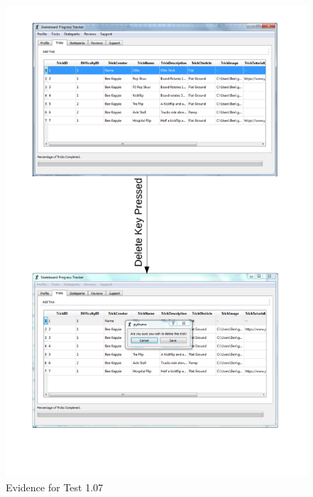 \begin{figure}[H]
    \includegraphics[width=\textwidth]{./Testing/AnnotatedSamples/Test107p1.pdf}
    \caption{Evidence for Test 1.07} \label{fig:Test 1.07p1}
\end{figure}

